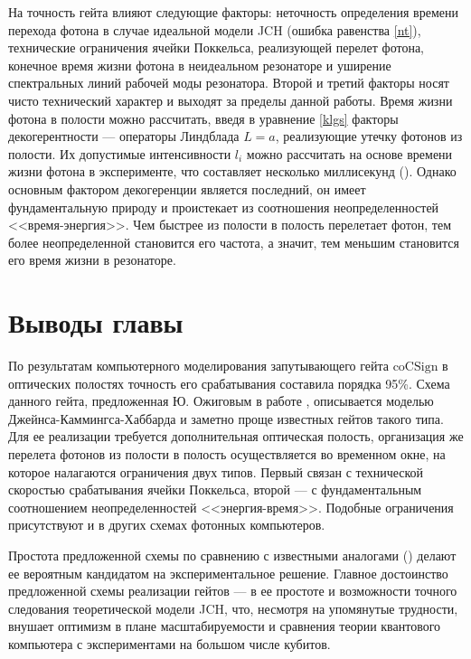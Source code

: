 На точность гейта влияют следующие факторы: неточность определения времени перехода фотона в случае идеальной модели JCH (ошибка равенства \eqref{nt}), технические ограничения ячейки Поккельса, реализующей перелет фотона, конечное время жизни фотона в неидеальном резонаторе и уширение спектральных линий рабочей моды резонатора. Второй и третий факторы носят чисто технический характер и выходят за пределы данной работы. Время жизни фотона в полости можно рассчитать, введя в уравнение \eqref{klgs} факторы декогерентности --- операторы Линдблада $L = a$, реализующие утечку фотонов из полости. Их допустимые интенсивности $l_{i}$ можно рассчитать на основе времени жизни фотона в эксперименте, что составляет несколько миллисекунд (\cite{rempe}). Однако основным фактором декогеренции является последний, он имеет фундаментальную природу и проистекает из соотношения неопределенностей <<время-энергия>>. Чем быстрее из полости в полость перелетает фотон, тем более неопределенной становится его частота, а значит, тем меньшим становится его время жизни в резонаторе.

\section{Выводы главы}\label{sec:ch5/sect3}

По результатам компьютерного моделирования запутывающего гейта $\text{coCSign}$ в оптических полостях точность его срабатывания составила порядка 95\%. Схема данного гейта, предложенная Ю. Ожиговым в работе \cite{ozhigov_quantum_gates}, описывается моделью Джейнса-Каммингса-Хаббарда и заметно проще известных гейтов такого типа. Для ее реализации требуется дополнительная оптическая полость, организация же перелета фотонов из полости в полость осуществляется во временном окне, на которое налагаются ограничения двух типов. Первый связан с технической скоростью срабатывания ячейки Поккельса, второй --- с фундаментальным соотношением неопределенностей <<энергия-время>>. Подобные ограничения присутствуют и в других схемах фотонных компьютеров.

Простота предложенной схемы по сравнению с известными аналогами (\cite{azuma}) делают ее вероятным кандидатом на экспериментальное решение. Главное достоинство предложенной схемы реализации гейтов --- в ее простоте и возможности точного следования теоретической модели JCH, что, несмотря на упомянутые трудности, внушает оптимизм в плане масштабируемости и сравнения теории квантового компьютера с экспериментами на большом числе кубитов.
